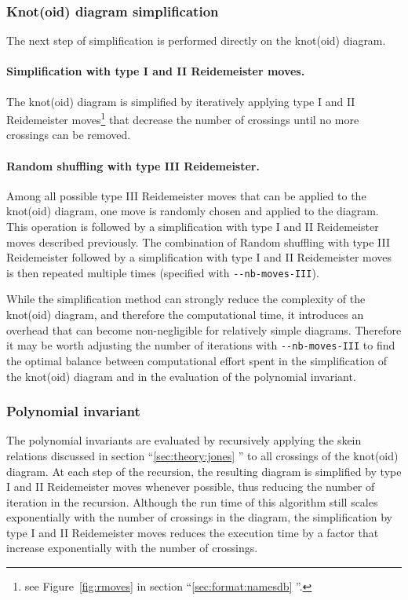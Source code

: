 \subsubsection{\label{sec:algorithms:diagramsimplication}Knot(oid) diagram simplification}
The next step of simplification is performed directly on the knot(oid) diagram.

\paragraph{Simplification with type I and II Reidemeister moves.}
The knot(oid) diagram is simplified by iteratively applying type I and II Reidemeister moves\footnote{see Figure~\ref{fig:rmoves} in section ``\ref{sec:format:namesdb} ''.} that decrease the number of crossings until no more crossings can be removed.

\paragraph{Random shuffling with type III Reidemeister.}
Among all possible type III Reidemeister moves that can be applied to the knot(oid) diagram, one move is randomly chosen and applied to the diagram.
This operation is followed by a simplification with  type I and II Reidemeister moves described previously.
The combination of Random shuffling with type III Reidemeister followed by a simplification with  type I and II Reidemeister moves is then repeated multiple times (specified with \lstinline{--nb-moves-III}).

While the simplification method can strongly reduce the complexity of the knot(oid) diagram, and therefore the computational time, it introduces an overhead that can become non-negligible for relatively simple diagrams. Therefore it may be worth adjusting the number of iterations with \lstinline{--nb-moves-III} to find the optimal balance between computational effort spent in the simplification of the knot(oid) diagram and in the evaluation of the polynomial invariant.


\subsubsection{\label{sec:algorithms:jonespolynomial}Polynomial invariant}
The polynomial invariants are evaluated by recursively applying the skein relations discussed in section ``\ref{sec:theory:jones} '' to all crossings of the knot(oid) diagram. At each step of the recursion, the resulting diagram is simplified by type I and II Reidemeister moves whenever possible, thus reducing the number of iteration in the recursion. Although the run time of this algorithm still scales exponentially with the number of crossings in the diagram, the simplification by type I and II Reidemeister moves reduces the execution time by a factor that increase exponentially with the number of crossings.


